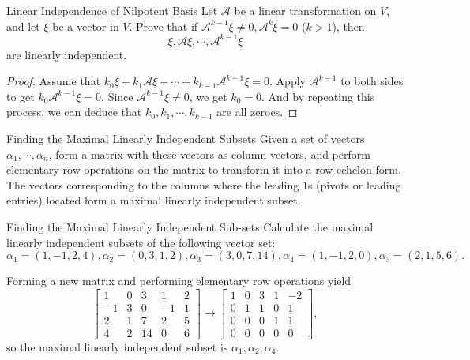 \begin{example}{Linear Independence of Nilpotent Basis}{}
  Let $\mathcal{A}$ be a linear transformation on $V$,
  and let $\xi$ be a vector in $V$.
  Prove that if $\mathcal{A}^{k - 1}\xi \neq 0, \mathcal{A}^k \xi = 0$ ($k > 1$),
  then
  \begin{equation}
    \xi, \mathcal{A} \xi, \cdots, \mathcal{A}^{k-1}\xi
  \end{equation}
  are linearly independent.
\end{example}

\begin{proof}
  Assume that $k_0 \xi + k_1 \mathcal{A} \xi + \cdots +
  k_{k-1}\mathcal{A}^{k-1}\xi = 0$.
  Apply $\mathcal{A}^{k-1}$ to both sides to get $k_0 \mathcal{A}^{k-1}\xi = 0$.
  Since $\mathcal{A}^{k-1}\xi \neq 0$,
  we get $k_0 = 0$.
  And by repeating this process, we can deduce that $k_0, k_1, \cdots, k_{k-1}$
  are all zeroes.
\end{proof}

\begin{proposition}{Finding the Maximal Linearly Independent Subsets}{}
  Given a set of vectors $\alpha_1, \cdots, \alpha_n$,
  form a matrix with these vectors as column vectors,
  and perform elementary row operations on the matrix to transform it into a
  row-echelon form.
  The vectors corresponding to the columns where the leading $1$s (pivots or
  leading entries) located form a maximal linearly independent subset.
\end{proposition}

\begin{example}{Finding the Maximal Linearly Independent Sub-sets}{}
  Calculate the maximal linearly independent subsets of the following vector set:
  \begin{equation}
    \alpha_1 = (1, -1, 2, 4), \alpha_2 = (0, 3, 1, 2), \alpha_3 = (3, 0, 7, 14), \alpha_4 = (1, -1, 2, 0), \alpha_5 = (2, 1, 5, 6).
  \end{equation}
\end{example}

\begin{solution}
  Forming a new matrix and performing elementary row operations yield
  \begin{equation}
    \begin{bmatrix}1&0&3&1&2\\-1&3&0&-1&1\\2&1&7&2&5\\4&2&14&0&6\end{bmatrix}\to\begin{bmatrix}1&0&3&1&-2\\0&1&1&0&1\\0&0&0&1&1\\0&0&0&0&0\end{bmatrix},
  \end{equation}
  so the maximal linearly independent subset is $\alpha_1, \alpha_2, \alpha_4$.
\end{solution}

